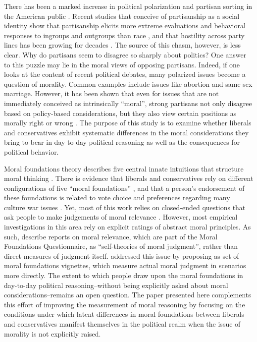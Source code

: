 \documentclass[12pt]{article}
\begin{document}

There has been a marked increase in political polarization and partisan sorting in the American public \citep{abramowitz2013polarized,levendusky2009partisan}. Recent studies that conceive of partisanship as a social identity show that partisanship elicits more extreme evaluations and behavioral responses to ingroups and outgroups than race \citep[e.g.][]{iyengar2014fear}, and that hostility across party lines has been growing for decades \citep{haidt2012look,iyengar2012affect}. The source of this chasm, however, is less clear. Why do partisans seem to disagree so sharply about politics?  One answer to this puzzle may lie in the moral views of opposing partisans. Indeed, if one looks at the content of recent political debates, many polarized issues become a question of morality. Common examples include issues like abortion and same-sex marriage. However, it has been shown that even for issues that are not immediately conceived as intrinsically ``moral'', strong partisans not only disagree based on policy-based considerations, but they also view certain positions as morally right or wrong \citep{skitka2005moral,skitka2010psychology,ryan2014reconsidering}. The purpose of this study is to examine whether liberals and conservatives exhibit systematic differences in the moral considerations they bring to bear in day-to-day political reasoning as well as the consequences for political behavior.

Moral foundations theory describes five central innate intuitions that structure moral thinking \citep{haidt2008moral}. There is evidence that liberals and conservatives rely on different configurations of five “moral foundations” \citep{graham2009liberals}, and that a person’s endorsement of these foundations is related to vote choice \citep{iyer2010beyond} and preferences regarding many culture war issues \citet{koleva2012tracing}. Yet, most of this work relies on closed-ended questions that ask people to make judgements of moral relevance \citep{clifford2015moral}. However, most empirical investigations in this area rely on explicit ratings of abstract moral principles. As such, \citet[1031]{graham2009liberals} describe reports on moral relevance, which are part of the Moral Foundations Questionnaire, as ``self-theories of moral judgment'', rather than direct measures of judgment itself. \citet{clifford2015moral} addressed this issue by proposing as set of moral foundations vignettes, which measure actual moral judgment in scenarios more directly. The extent to which people draw upon the moral foundations in day-to-day political reasoning--without being explicitly asked about moral considerations--remains an open question. The paper presented here complements this effort of improving the measurement of moral reasoning by focusing on the conditions under which latent differences in moral foundations between liberals and conservatives manifest themselves in the political realm when the issue of morality is not explicitly raised.
\end{document}
